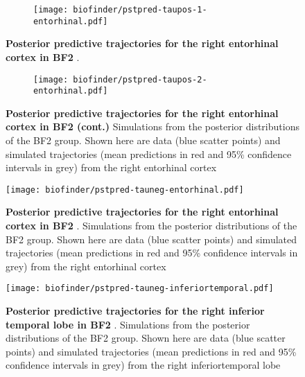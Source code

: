 \begin{figure}[H]
    \centering
    \begin{subfigure}{1.0\textwidth}
        \texttt{[image: biofinder/pstpred-taupos-1-entorhinal.pdf]}
        \label{fig:pstpred-taupos-ec-1-bf}
    \end{subfigure} 
    \medskip
    \caption{\textbf{Posterior predictive trajectories for the right
                     entorhinal cortex in BF2 \ABP \TPP}.}
\end{figure}%
\begin{figure}[H]\ContinuedFloat
    \centering
    \begin{subfigure}{1.0\textwidth}
        \texttt{[image: biofinder/pstpred-taupos-2-entorhinal.pdf]}
        \label{fig:pstpred-taupos-ec-2-bf}
    \end{subfigure}
    \caption[]{\textbf{Posterior predictive trajectories for the right
                       entorhinal cortex in BF2 \ABP \TPP (cont.)}
    Simulations from the posterior distributions of the BF2
    \ABP \TPP group. Shown here are data (blue scatter points) and simulated 
    trajectories (mean predictions in red and 95\% confidence intervals in grey)
    from the right entorhinal cortex}
    \label{fig:pstpred-taupos-ec-bf}
\end{figure}


\begin{figure}[H]
    \centering
    \texttt{[image: biofinder/pstpred-tauneg-entorhinal.pdf]}
    \caption{\textbf{Posterior predictive trajectories for the right
                     entorhinal cortex in BF2 \ABP \TPN}.
    Simulations from the posterior distributions of the BF2
    \ABP \TPN group. Shown here are data (blue scatter points) and simulated 
    trajectories (mean predictions in red and 95\% confidence intervals in grey)
    from the right entorhinal cortex}
    \label{fig:pstpred-tauneg-ec-bf}
\end{figure}

\begin{figure}[H]
    \centering
    \texttt{[image: biofinder/pstpred-tauneg-inferiortemporal.pdf]}
    \caption{\textbf{Posterior predictive trajectories for the right
                     inferior temporal lobe in BF2 \ABP \TPN}.
    Simulations from the posterior distributions of the BF2
    \ABP \TPN group. Shown here are data (blue scatter points) and simulated 
    trajectories (mean predictions in red and 95\% confidence intervals in grey)
    from the right inferiortemporal lobe}
    \label{fig:pstpred-tauneg-it-bf}
\end{figure}


